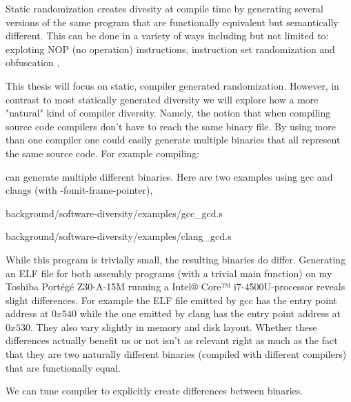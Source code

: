Static randomization creates divesity at compile time by generating several versions of the
same program that are functionally equivalent but semantically different. This can be done
in a variety of ways including but not limited to: exploting NOP (no operation) instructions,
instruction set randomization and obfuscation \cite[Section~4.1.1]{survey},

This thesis will focus on static, compiler generated randomization. However, in contrast
to most statically generated diversity we will explore how a more "natural" kind of compiler
diversity. Namely, the notion that when compiling source code compilers don't have to reach
the same binary file. By using more than one compiler one could easily generate multiple
binaries that all represent the same source code. For example compiling:



can generate multiple different binaries. Here are two examples using gcc and clangs (with
-fomit-frame-pointer),


{background/software-diversity/examples/gcc_gcd.s}


{background/software-diversity/examples/clang_gcd.s}

While this program is trivially small, the resulting binaries do differ. Generating an
ELF file for both assembly programs (with a trivial main function) on my Toshiba Portégé 
Z30-A-15M running a Intel® Core™ i7-4500U-processor reveals slight differences. For example
the ELF file emitted by gcc has the entry point address at $0x540$ while the one emitted 
by clang has the entry point address at $0x530$. They also vary slightly in memory and 
disk layout. Whether these differences actually benefit us or not isn't as relevant right
as much as the fact that they are two naturally different binaries (compiled with different
compilers) that are functionally equal.

We can tune compiler to explicitly create differences between binaries.


